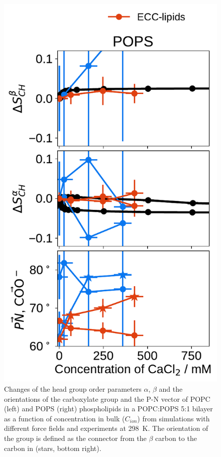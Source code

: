 \documentclass[12pt,a4paper,twoside,openright]{report}
\begin{document}
\begin{figure}[tbp!]
  \includegraphics[width=\figwidthsmall]{../img/ecc_pops/order_parameters_changes_ecc-lip_L14_A-B-PN-COO_POPS_cacl.pdf} 
  \caption{\label{fig:delta_ordPar_CaCl_PCPS} 
    Changes of the head group order parameters $\alpha$, $\beta$ and the orientations of the carboxylate group and the P-N vector  
    of POPC (left) and POPS (right) phospholipids in a POPC:POPS 5:1 bilayer as a function of  concentration 
    in bulk ($C_{ion}$) from simulations with different force fields and experiments at 298~K. \citep{roux90}
    The orientation of the  group is defined as 
    the connector from the $\beta$ carbon to the carbon in  (stars, bottom right). 
  } 
\end{figure} 
\end{document}
